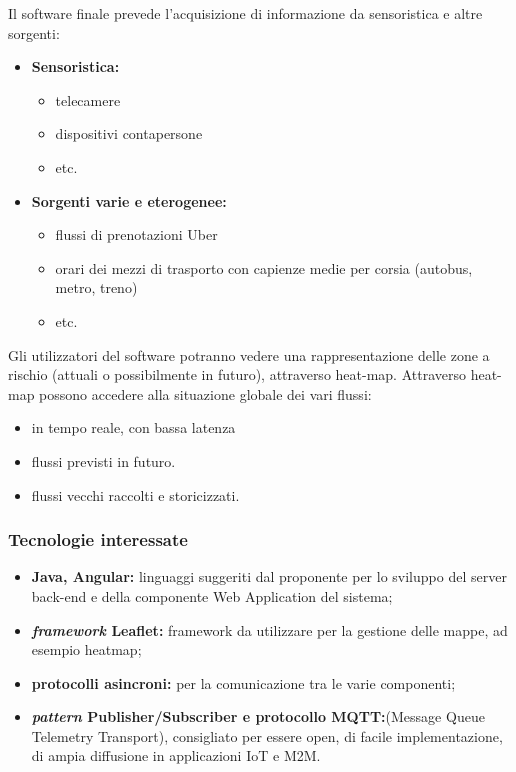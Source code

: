 Il software finale prevede l'acquisizione di informazione da sensoristica e altre sorgenti:
\begin{itemize}
	\item{\textbf{Sensoristica:}}
	    \begin{itemize}
	        \item telecamere
	        \item dispositivi contapersone
	        \item etc.
	    \end{itemize}
	\item{\textbf{Sorgenti varie e eterogenee:}}
	    \begin{itemize}
	        \item flussi di prenotazioni Uber
	        \item orari dei mezzi di trasporto con capienze medie per corsia (autobus, metro, treno)
	        \item etc.
	\end{itemize}
\end{itemize}
Gli utilizzatori del software potranno vedere una rappresentazione delle zone a rischio (attuali o possibilmente in futuro), attraverso heat-map.
Attraverso heat-map possono accedere alla situazione globale dei vari flussi:
\begin{itemize}
    \item in tempo reale, con bassa latenza
    \item flussi previsti in futuro.
    \item flussi vecchi raccolti e storicizzati.
\end{itemize}


\subsubsection{Tecnologie interessate}

\begin{itemize}
	\item{\textbf{Java, Angular:}} linguaggi suggeriti dal proponente per lo sviluppo del server back-end e della componente Web Application del sistema;
	\item{\textbf{\textit{framework} Leaflet:}} framework da utilizzare per la gestione delle mappe, ad esempio heatmap;
	\item{\textbf{protocolli asincroni:}} per la comunicazione tra le varie componenti;
	\item{\textbf{\textit{pattern} Publisher/Subscriber e protocollo MQTT:}}\newline (Message Queue Telemetry Transport), consigliato per essere open, di facile implementazione, di ampia diffusione in applicazioni IoT e M2M.
\end{itemize}

